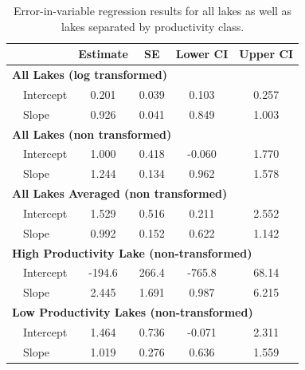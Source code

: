 \documentclass[12pt, oneside]{article}
\begin{document}
\newpage
\begin{table}[h]
\centering
\begin{threeparttable}
\caption{Error-in-variable regression results for all lakes as well as lakes separated by productivity class.}
\label{tab:table2}
\begin{tabular}{@{}llcccc@{}}
\toprule
            &    & Estimate  & SE    & Lower CI  & Upper CI  \\ \midrule
\multicolumn{6}{l}{\bf{All Lakes (log transformed)}} \\
& Intercept       & 0.201     & 0.039 & 0.103    & 0.257  \\
& Slope           & 0.926     & 0.041 & 0.849     & 1.003 \\
\multicolumn{6}{l}{\bf{All Lakes (non transformed)}} \\
& Intercept       & 1.000     & 0.418 & -0.060    & 1.770  \\
& Slope           & 1.244     & 0.134 & 0.962     & 1.578 \\
\multicolumn{6}{l}{\bf{All Lakes Averaged (non transformed)}} \\
& Intercept       & 1.529     & 0.516 & 0.211    & 2.552  \\
& Slope           & 0.992     & 0.152 & 0.622     & 1.142 \\
\multicolumn{6}{l}{\bf{High Productivity Lake (non-transformed)}} \\
& Intercept       & -194.6     & 266.4 & -765.8    & 68.14  \\
& Slope           & 2.445     & 1.691 & 0.987     & 6.215 \\
\multicolumn{6}{l}{\bf{Low Productivity Lakes (non-transformed)}} \\
& Intercept       & 1.464     & 0.736 & -0.071    & 2.311  \\
& Slope           & 1.019     & 0.276 & 0.636     & 1.559 \\
 \bottomrule
\end{tabular}
\end{threeparttable}
\end{table} %
\end{document}
